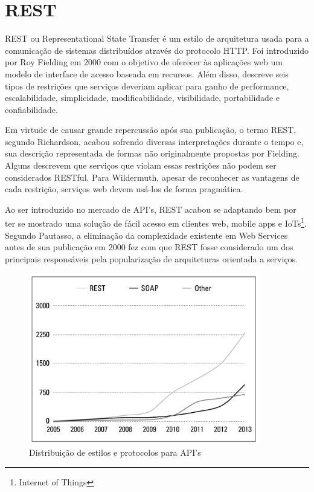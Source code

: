 \section{REST}

REST ou Representational State Transfer é um estilo de arquitetura usada para a comunicação de sistemas distribuídos através do protocolo HTTP. Foi introduzido por Roy Fielding em 2000 com o objetivo de oferecer às aplicações web um modelo de interface de acesso baseada em recursos. Além disso, descreve seis tipos de restrições que serviços deveriam aplicar para ganho de performance, escalabilidade, simplicidade, modificabilidade, visibilidade, portabilidade e confiabilidade.

Em virtude de causar grande repercussão após sua publicação, o termo REST, segundo Richardson, acabou sofrendo diversas interpretações durante o tempo e, sua descrição representada de formas não originalmente propostas por Fielding. Alguns descrevem que serviços que violam essas restrições não podem ser considerados RESTful. Para Wildermuth, apesar de reconhecer as vantagens de cada restrição, serviços web devem usá-los de forma pragmática. \cite{RichardsonEtAl2013} \cite{Wildermuth2015}

Ao ser introduzido no mercado de API's, REST acabou se adaptando bem por ter se mostrado uma solução de fácil acesso em clientes web, mobile apps e IoTs\footnote{
  Internet of Things
}. Segundo Pautasso, a eliminação da complexidade existente em Web Services antes de sua publicação em 2000 fez com que REST fosse considerado um dos principais responsáveis pela popularização de arquiteturas orientada a serviços. \cite{PautassoEtAl2008}

\begin{figure}[H]
  \centering    \includegraphics[width=0.9\textwidth,height=\textheight,keepaspectratio]{figuras/api-styles.jpg}
  \caption{Distribuição de estilos e protocolos para API's}
\end{figure}

